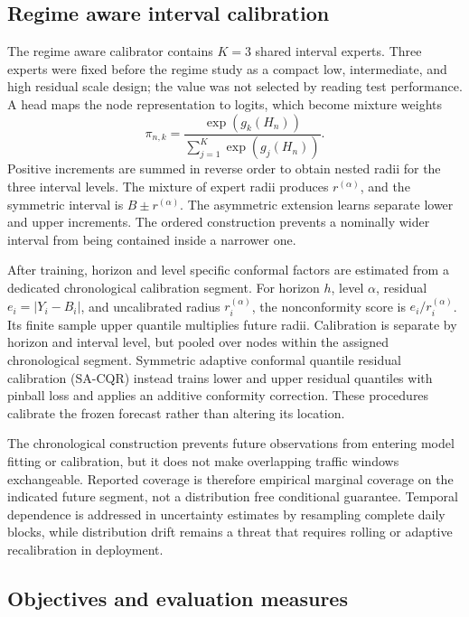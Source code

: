 \documentclass[pdflatex,sn-mathphys-num]{sn-jnl}
\begin{document}
\subsection{Regime aware interval calibration}\label{subsec:rac}

The regime aware calibrator contains \(K=3\) shared interval experts. Three experts were fixed before the regime study as a compact low, intermediate, and high residual scale design; the value was not selected by reading test performance. A head maps the node representation to logits, which become mixture weights
\begin{equation}
 \pi_{n,k}=\frac{\exp(g_k(H_n))}
 {\sum_{j=1}^{K}\exp(g_j(H_n))}.
\label{eq:gate}
\end{equation}
Positive increments are summed in reverse order to obtain nested radii for the three interval levels. The mixture of expert radii produces \(r^{(\alpha)}\), and the symmetric interval is \(B\pm r^{(\alpha)}\). The asymmetric extension learns separate lower and upper increments. The ordered construction prevents a nominally wider interval from being contained inside a narrower one.

After training, horizon and level specific conformal factors are estimated from a dedicated chronological calibration segment. For horizon $h$, level \(\alpha\), residual $e_i=|Y_i-B_i|$, and uncalibrated radius $r_i^{(\alpha)}$, the nonconformity score is $e_i/r_i^{(\alpha)}$. Its finite sample upper quantile multiplies future radii. Calibration is separate by horizon and interval level, but pooled over nodes within the assigned chronological segment. Symmetric adaptive conformal quantile residual calibration (SA-CQR) instead trains lower and upper residual quantiles with pinball loss and applies an additive conformity correction. These procedures calibrate the frozen forecast rather than altering its location.

The chronological construction prevents future observations from entering model fitting or calibration, but it does not make overlapping traffic windows exchangeable. Reported coverage is therefore empirical marginal coverage on the indicated future segment, not a distribution free conditional guarantee. Temporal dependence is addressed in uncertainty estimates by resampling complete daily blocks, while distribution drift remains a threat that requires rolling or adaptive recalibration in deployment.

\subsection{Objectives and evaluation measures}\label{subsec:metrics}
\end{document}
